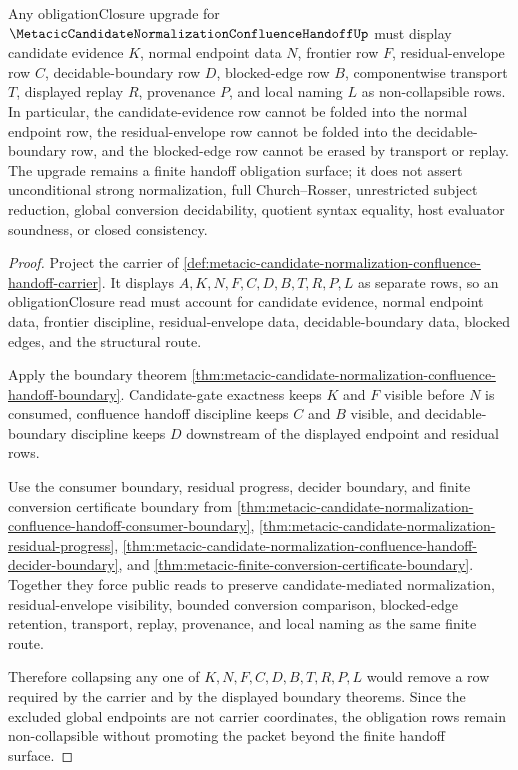 \begin{theorem}
\label{thm:metacic-candidate-normalization-confluence-handoff-obligation-rows}
Any obligationClosure upgrade for $\MetacicCandidateNormalizationConfluenceHandoffUp$ must display candidate evidence $K$, normal endpoint data $N$, frontier row $F$, residual-envelope row $C$, decidable-boundary row $D$, blocked-edge row $B$, componentwise transport $T$, displayed replay $R$, provenance $P$, and local naming $L$ as non-collapsible rows. In particular, the candidate-evidence row cannot be folded into the normal endpoint row, the residual-envelope row cannot be folded into the decidable-boundary row, and the blocked-edge row cannot be erased by transport or replay. The upgrade remains a finite handoff obligation surface; it does not assert unconditional strong normalization, full Church--Rosser, unrestricted subject reduction, global conversion decidability, quotient syntax equality, host evaluator soundness, or closed consistency.
\end{theorem}
\begin{proof}
Project the carrier of \autoref{def:metacic-candidate-normalization-confluence-handoff-carrier}. It displays $A,K,N,F,C,D,B,T,R,P,L$ as separate rows, so an obligationClosure read must account for candidate evidence, normal endpoint data, frontier discipline, residual-envelope data, decidable-boundary data, blocked edges, and the structural route.

Apply the boundary theorem \autoref{thm:metacic-candidate-normalization-confluence-handoff-boundary}. Candidate-gate exactness keeps $K$ and $F$ visible before $N$ is consumed, confluence handoff discipline keeps $C$ and $B$ visible, and decidable-boundary discipline keeps $D$ downstream of the displayed endpoint and residual rows.

Use the consumer boundary, residual progress, decider boundary, and finite conversion certificate boundary from \autoref{thm:metacic-candidate-normalization-confluence-handoff-consumer-boundary}, \autoref{thm:metacic-candidate-normalization-residual-progress}, \autoref{thm:metacic-candidate-normalization-confluence-handoff-decider-boundary}, and \autoref{thm:metacic-finite-conversion-certificate-boundary}. Together they force public reads to preserve candidate-mediated normalization, residual-envelope visibility, bounded conversion comparison, blocked-edge retention, transport, replay, provenance, and local naming as the same finite route.

Therefore collapsing any one of $K,N,F,C,D,B,T,R,P,L$ would remove a row required by the carrier and by the displayed boundary theorems. Since the excluded global endpoints are not carrier coordinates, the obligation rows remain non-collapsible without promoting the packet beyond the finite handoff surface.
\end{proof}

